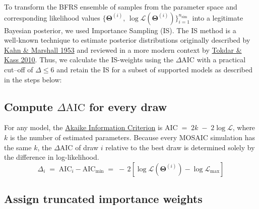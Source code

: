 \documentclass[
]{book}
\begin{document}
To transform the BFRS ensemble of samples from the parameter space and corresponding likelihood values
\(\bigl\{\boldsymbol{\Theta}^{(i)},\,\log\mathcal{L}(\boldsymbol{\Theta}^{(i)})\bigr\}_{i=1}^{n_{\text{sim}}}\) into a legitimate Bayesian posterior, we used Importance Sampling (IS). The IS method is a well‑known technique to estimate posterior distributions originally described by \href{https://pubsonline.informs.org/doi/10.1287/opre.1.5.263}{Kahn \& Marshall 1953} and reviewed in a more modern context by \href{https://doi.org/10.1002/wics.56}{Tokdar \& Kass 2010}. Thus, we calculate the IS-weights using the \(\Delta \text{AIC}\) with a practical cut--off of \(\Delta \le 6\) and retain the IS for a subset of supported models as described in the steps below:

\subsection{\texorpdfstring{Compute \(\Delta \text{AIC}\) for every draw}{Compute \textbackslash Delta \textbackslash text\{AIC\} for every draw}}\label{compute-delta-textaic-for-every-draw}

For any model, the \href{https://en.wikipedia.org/wiki/Akaike_information_criterion}{Akaike Information Criterion} is \(\text{AIC} \;=\; 2k \;-\; 2\log\mathcal{L}\), where \(k\) is the number of estimated parameters. Because every MOSAIC simulation has the same \(k\), the \(\Delta \text{AIC}\) of draw \(i\) relative to the best draw is determined solely by the difference in log-likelihood.
\begin{equation}
\Delta_i
\;=\;
\text{AIC}_i - \text{AIC}_{\text{min}}
\;=\;
-\,2\!\left[\log\mathcal{L}(\boldsymbol{\Theta}^{(i)}) -
\log\mathcal{L}_{\max}\right]
\label{eq:aic-delta}
\end{equation}

\subsection{Assign truncated importance weights}\label{assign-truncated-importance-weights}
\end{document}
